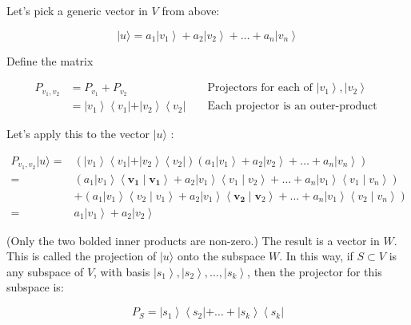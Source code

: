 \documentclass[main.tex]{subfiles}
\begin{document}
    Let's pick a generic vector in $V$ from above:
    
    $$
    |u\rangle=a_{1}\left|v_{1}\right\rangle+a_{2}\left|v_{2}\right\rangle+\ldots+a_{n}\left|v_{n}\right\rangle
    $$
    
    Define the matrix
    
    $$
    \begin{aligned}
    P_{v_{1}, v_{2}} &=P_{v_{1}}+P_{v_{2}} & & \text { Projectors for each of }\left|v_{1}\right\rangle,\left|v_{2}\right\rangle \\
    &=\left|v_{1}\right\rangle\left\langle v_{1}|+| v_{2}\right\rangle\left\langle v_{2}\right| & & \text { Each projector is an outer-product }
    \end{aligned}
    $$
    
    Let's apply this to the vector $|u\rangle$ :
    
    $$
    \begin{aligned}
    P_{v_{1}, v_{2}}|u\rangle=&\left(\left|v_{1}\right\rangle\left\langle v_{1}|+| v_{2}\right\rangle\left\langle v_{2}\right|\right)\left(a_{1}\left|v_{1}\right\rangle+a_{2}\left|v_{2}\right\rangle+\ldots+a_{n}\left|v_{n}\right\rangle\right) \\
    =&\left(a_{1}\left|v_{1}\right\rangle\left\langle\mathbf{v}_{\mathbf{1}} \mid \mathbf{v}_{\mathbf{1}}\right\rangle+a_{2}\left|v_{1}\right\rangle\left\langle v_{1} \mid v_{2}\right\rangle+\ldots+a_{n}\left|v_{1}\right\rangle\left\langle v_{1} \mid v_{n}\right\rangle\right) \\
    &+\left(a_{1}\left|v_{1}\right\rangle\left\langle v_{2} \mid v_{1}\right\rangle+a_{2}\left|v_{1}\right\rangle\left\langle\mathbf{v}_{\mathbf{2}} \mid \mathbf{v}_{2}\right\rangle+\ldots+a_{n}\left|v_{1}\right\rangle\left\langle v_{2} \mid v_{n}\right\rangle\right) \\
    =& a_{1}\left|v_{1}\right\rangle+a_{2}\left|v_{2}\right\rangle
    \end{aligned}
    $$
    
    (Only the two bolded inner products are non-zero.) The result is a vector in $W$. This is called the projection of $|u\rangle$ onto the subspace $W$. In this way, if $S \subset V$ is any subspace of $V$, with basis $\left|s_{1}\right\rangle,\left|s_{2}\right\rangle, \ldots,\left|s_{k}\right\rangle$, then the projector for this subspace is:
    
    $$
    P_{S}=\left|s_{1}\right\rangle\left\langle s_{2}|+\ldots+| s_{k}\right\rangle\left\langle s_{k}\right|
    $$
    
\end{document}
